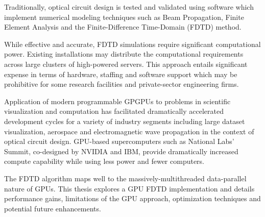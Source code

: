 Traditionally, optical circuit design is tested and validated using software which implement numerical modeling techniques such as Beam Propagation, Finite Element Analysis and the Finite-Difference Time-Domain (FDTD) method.

While effective and accurate, FDTD simulations require significant computational power. Existing installations may distribute the computational requirements across large clusters of high-powered servers. This approach entails significant expense in terms of hardware, staffing and software support which may be prohibitive for some research facilities and private-sector engineering firms.

Application of modern programmable GPGPUs to problems in scientific visualization and computation has facilitated dramatically accelerated development cycles for a variety of industry segments including large dataset visualization\cite{geodesicGrid}\cite{raycasting}, aerospace\cite{Strzodka2013381} and electromagnetic wave propagation in the context of optical circuit design. GPU-based supercomputers such as National Labs' Summit\cite{nvidiaNationalLabs}, co-designed by NVIDIA and IBM, provide dramatically increased compute capability while using less power and fewer computers. 

The FDTD algorithm maps well to the massively-multithreaded data-parallel nature of GPUs. This thesis explores a GPU FDTD implementation and details performance gains, limitations of the GPU approach, optimization techniques and potential future enhancements. 